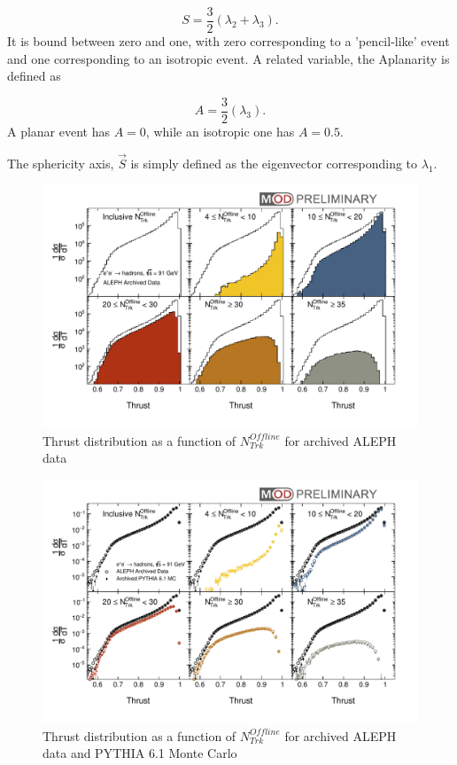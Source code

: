 \begin{equation}
S=\frac{3}{2}(\lambda_{2}+\lambda_{3}).
\end{equation}
It is bound between zero and one, with zero corresponding to a 'pencil-like' event and one corresponding to an isotropic event.  A related variable, the Aplanarity is defined as

\begin{equation}
A=\frac{3}{2}(\lambda_{3}).
\end{equation}
A planar event has $A=0$, while an isotropic one has $A=0.5$.

The sphericity axis, $\vec{S}$ is simply defined as the eigenvector corresponding to $\lambda_1$.


\begin{figure}[!htb]
\begin{center}
\includegraphics[width=.45\textwidth]{../../Plotting/src/plots/multiPanel_thrust_nTrk.pdf}
\caption{Thrust distribution as a function of $N_{Trk}^{Offline}$ for archived ALEPH data}
\label{fig:multiPanel_thrust_nTrk}
\end{center}
\end{figure}

\begin{figure}[!htb]
\begin{center}
\includegraphics[width=.45\textwidth]{../../Plotting/src/plots/multiPanel_thrust_nTrk_MC.pdf}
\caption{Thrust distribution as a function of $N_{Trk}^{Offline}$ for archived ALEPH data and PYTHIA 6.1 Monte Carlo}
\label{fig:multiPanel_thrust_nTrk_MC}
\end{center}
\end{figure}
